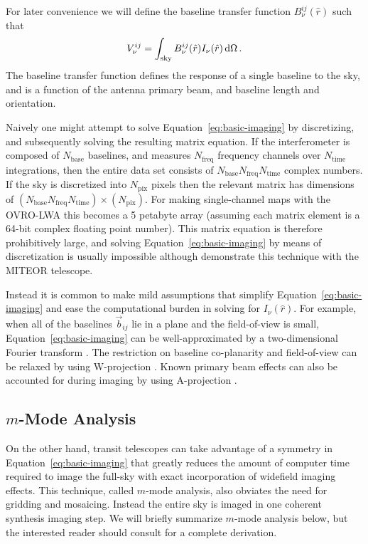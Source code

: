 \documentclass[twocolumn]{aastex61}
\renewcommand{\d}{{\rm d}}
\begin{document}
For later convenience we will define the baseline transfer function $B^{ij}_\nu(\hat r)$ such that
\begin{equation}\label{eq:baseline-transfer-function}
    V^{ij}_\nu = \int_\text{sky} B^{ij}_\nu(\hat r) I_\nu(\hat r) \,\d\Omega \, .
\end{equation}
The baseline transfer function defines the response of a single baseline to the sky, and is a
function of the antenna primary beam, and baseline length and orientation.

Naively one might attempt to solve Equation~\ref{eq:basic-imaging} by discretizing, and subsequently
solving the resulting matrix equation. If the interferometer is composed of $N_\text{base}$
baselines, and measures $N_\text{freq}$ frequency channels over $N_\text{time}$ integrations, then
the entire data set consists of $N_\text{base}N_\text{freq}N_\text{time}$ complex numbers. If the
sky is discretized into $N_\text{pix}$ pixels then the relevant matrix has dimensions of
$(N_\text{base}N_\text{freq}N_\text{time})\times(N_\text{pix})$. For making single-channel maps with
the OVRO-LWA this becomes a 5 petabyte array (assuming each matrix element is a 64-bit complex
floating point number).  This matrix equation is therefore prohibitively large, and solving
Equation~\ref{eq:basic-imaging} by means of discretization is usually impossible although
\citet{2017MNRAS.465.2901Z} demonstrate this technique with the MITEOR telescope.

Instead it is common to make mild assumptions that simplify Equation~\ref{eq:basic-imaging} and ease
the computational burden in solving for $I_\nu(\hat r)$. For example, when all of the baselines
$\vec b_{ij}$ lie in a plane and the field-of-view is small, Equation~\ref{eq:basic-imaging} can be
well-approximated by a two-dimensional Fourier transform \citep{2001isra.book.....T}. The
restriction on baseline co-planarity and field-of-view can be relaxed by using W-projection
\citep{2008ISTSP...2..647C}. Known primary beam effects can also be accounted for during imaging by
using A-projection \citep{2013ApJ...770...91B}.

\subsection{$m$-Mode Analysis}\label{sec:mmode-analysis}

On the other hand, transit telescopes can take advantage of a symmetry in
Equation~\ref{eq:basic-imaging} that greatly reduces the amount of computer time required to image
the full-sky with exact incorporation of widefield imaging effects. This technique, called $m$-mode
analysis, also obviates the need for gridding and mosaicing. Instead the entire sky is imaged in one
coherent synthesis imaging step.  We will briefly summarize $m$-mode analysis below, but the
interested reader should consult \citet{2014ApJ...781...57S, 2015PhRvD..91h3514S} for a complete
derivation.
\end{document}
